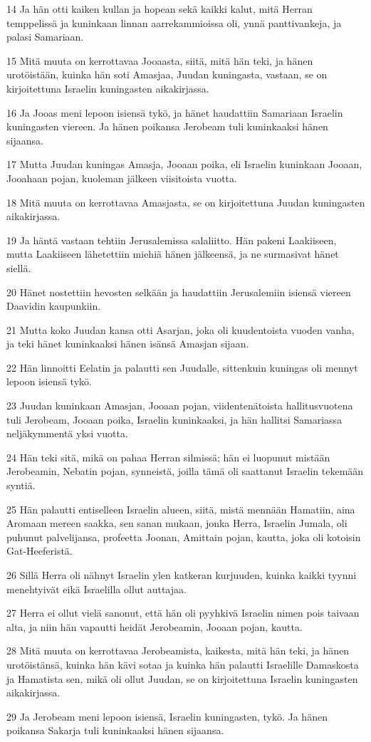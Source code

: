 \par 14 Ja hän otti kaiken kullan ja hopean sekä kaikki kalut, mitä Herran temppelissä ja kuninkaan linnan aarrekammioissa oli, ynnä panttivankeja, ja palasi Samariaan.
\par 15 Mitä muuta on kerrottavaa Jooaasta, siitä, mitä hän teki, ja hänen urotöistään, kuinka hän soti Amasjaa, Juudan kuningasta, vastaan, se on kirjoitettuna Israelin kuningasten aikakirjassa.
\par 16 Ja Jooas meni lepoon isiensä tykö, ja hänet haudattiin Samariaan Israelin kuningasten viereen. Ja hänen poikansa Jerobeam tuli kuninkaaksi hänen sijaansa.
\par 17 Mutta Juudan kuningas Amasja, Jooaan poika, eli Israelin kuninkaan Jooaan, Jooahaan pojan, kuoleman jälkeen viisitoista vuotta.
\par 18 Mitä muuta on kerrottavaa Amasjasta, se on kirjoitettuna Juudan kuningasten aikakirjassa.
\par 19 Ja häntä vastaan tehtiin Jerusalemissa salaliitto. Hän pakeni Laakiiseen, mutta Laakiiseen lähetettiin miehiä hänen jälkeensä, ja ne surmasivat hänet siellä.
\par 20 Hänet nostettiin hevosten selkään ja haudattiin Jerusalemiin isiensä viereen Daavidin kaupunkiin.
\par 21 Mutta koko Juudan kansa otti Asarjan, joka oli kuudentoista vuoden vanha, ja teki hänet kuninkaaksi hänen isänsä Amasjan sijaan.
\par 22 Hän linnoitti Eelatin ja palautti sen Juudalle, sittenkuin kuningas oli mennyt lepoon isiensä tykö.
\par 23 Juudan kuninkaan Amasjan, Jooaan pojan, viidentenätoista hallitusvuotena tuli Jerobeam, Jooaan poika, Israelin kuninkaaksi, ja hän hallitsi Samariassa neljäkymmentä yksi vuotta.
\par 24 Hän teki sitä, mikä on pahaa Herran silmissä; hän ei luopunut mistään Jerobeamin, Nebatin pojan, synneistä, joilla tämä oli saattanut Israelin tekemään syntiä.
\par 25 Hän palautti entiselleen Israelin alueen, siitä, mistä mennään Hamatiin, aina Aromaan mereen saakka, sen sanan mukaan, jonka Herra, Israelin Jumala, oli puhunut palvelijansa, profeetta Joonan, Amittain pojan, kautta, joka oli kotoisin Gat-Heeferistä.
\par 26 Sillä Herra oli nähnyt Israelin ylen katkeran kurjuuden, kuinka kaikki tyynni menehtyivät eikä Israelilla ollut auttajaa.
\par 27 Herra ei ollut vielä sanonut, että hän oli pyyhkivä Israelin nimen pois taivaan alta, ja niin hän vapautti heidät Jerobeamin, Jooaan pojan, kautta.
\par 28 Mitä muuta on kerrottavaa Jerobeamista, kaikesta, mitä hän teki, ja hänen urotöistänsä, kuinka hän kävi sotaa ja kuinka hän palautti Israelille Damaskosta ja Hamatista sen, mikä oli ollut Juudan, se on kirjoitettuna Israelin kuningasten aikakirjassa.
\par 29 Ja Jerobeam meni lepoon isiensä, Israelin kuningasten, tykö. Ja hänen poikansa Sakarja tuli kuninkaaksi hänen sijaansa.

